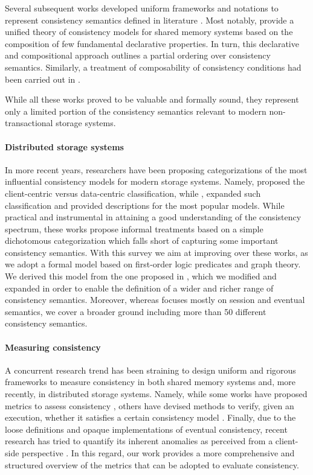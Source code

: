 \documentclass[letter, 11pt]{article}
\newcommand{\citeN}{\citet}
\renewcommand{\cite}{\citep}
\begin{document}
Several subsequent works developed uniform frameworks and notations
to represent consistency semantics defined in literature \cite{Adve.Hill:93,Raynal.Schiper:97,Bataller.Bernabeu:97}.
Most notably, \citeN{Steinke.Nutt:04} provide a unified theory of consistency models
for shared memory systems based on the composition of few fundamental declarative properties.
In turn, this declarative and compositional approach outlines a partial ordering over consistency semantics.
Similarly, a treatment of composability of consistency conditions had been carried out in \cite{Friedman.ea:03}.

While all these works proved to be valuable and formally sound,
they represent only a limited portion of the consistency semantics
relevant to modern non-transactional storage systems.

\paragraph*{Distributed storage systems}
In more recent years, researchers have been proposing categorizations of the most influential
consistency models for modern storage systems.
Namely, \citeN{Tanenbaum.Steen:07} proposed the client-centric versus
data-centric classification, while \citeN{Bermbach.Kuhlenkamp:13},
expanded such classification and provided descriptions for the most popular models.
While practical and instrumental in attaining a good understanding of the consistency spectrum,
these works propose informal treatments based on a simple dichotomous categorization
which falls short of capturing some important consistency semantics.
With this survey we aim at improving over these works, as we adopt a formal model
based on first-order logic predicates and graph theory.
We derived this model from the one proposed in \cite{Burckhardt:14}, 
which we modified and expanded in order to enable the definition of a wider and richer range of consistency semantics. Moreover, whereas \citeN{Burckhardt:14} focuses mostly on session and eventual semantics, we cover a broader ground including more than 50 different consistency semantics. 

\paragraph*{Measuring consistency}
A concurrent research trend has been straining to design uniform and 
rigorous frameworks to measure consistency in both shared memory systems 
and, more recently, in distributed storage systems.
Namely, while some works have proposed metrics to assess consistency \cite{Yu.Vahdat:02,Golab.ea:14},
others have devised methods to verify, given an execution, whether it satisfies a certain consistency model \cite{Misra:86,Gibbons.ea:97,Anderson.Li.ea:10}.
Finally, due to the loose definitions and opaque implementations of eventual consistency, 
recent research has tried to quantify its inherent anomalies as perceived from a client-side perspective
\cite{Wada.Fekete.ea:11,Patil.ea:11,Bermbach.Tai:11,Muntasir.Wojciech.ea:2012,Lu.ea:15}.
In this regard, our work provides a more comprehensive and structured overview of the metrics 
that can be adopted to evaluate consistency.
\end{document}
